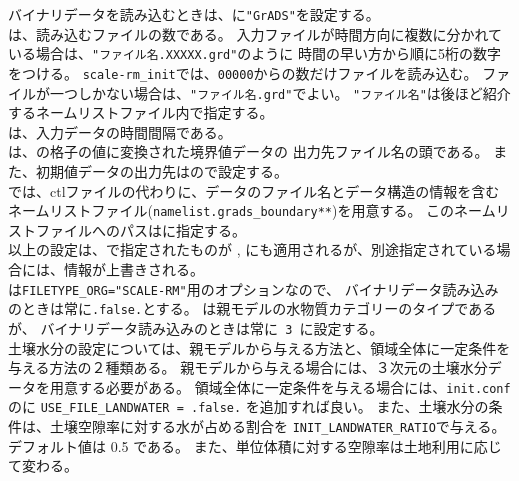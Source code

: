 バイナリデータを読み込むときは、に\verb|"GrADS"|を設定する。\\
は、読み込むファイルの数である。
入力ファイルが時間方向に複数に分かれている場合は、\verb|"ファイル名.XXXXX.grd"|のように
時間の早い方から順に5桁の数字をつける。
\verb|scale-rm_init|では、\verb|00000|からの数だけファイルを読み込む。
ファイルが一つしかない場合は、\verb|"ファイル名.grd"|でよい。
\verb|"ファイル名"|は後ほど紹介するネームリストファイル内で指定する。\\
は、入力データの時間間隔である。\\
は、\scalerm の格子の値に変換された境界値データの
出力先ファイル名の頭である。
また、初期値データの出力先はので設定する。\\
\scalerm では、ctlファイルの代わりに、データのファイル名とデータ構造の情報を含む
ネームリストファイル(\verb|namelist.grads_boundary**|)を用意する。
このネームリストファイルへのパスはに指定する。\\
以上の設定は、で指定されたものが
, 
にも適用されるが、別途指定されている場合には、情報が上書きされる。\\
%
は\verb|FILETYPE_ORG="SCALE-RM"|用のオプションなので、
バイナリデータ読み込みのときは常に\verb|.false.|とする。
は親モデルの水物質カテゴリーのタイプであるが、
バイナリデータ読み込みのときは常に\verb| 3 |に設定する。\\


土壌水分の設定については、親モデルから与える方法と、領域全体に一定条件を与える方法の２種類ある。
親モデルから与える場合には、３次元の土壌水分データを用意する必要がある。
領域全体に一定条件を与える場合には、\verb|init.conf|のに
\verb|USE_FILE_LANDWATER = .false.| を追加すれば良い。
また、土壌水分の条件は、土壌空隙率に対する水が占める割合を
\verb|INIT_LANDWATER_RATIO|で与える。デフォルト値は 0.5 である。
また、単位体積に対する空隙率は土地利用に応じて変わる。\\

\\


